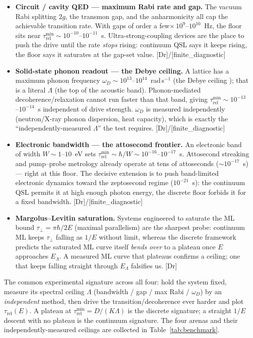 \documentclass[10pt,twocolumn]{article}
\theoremstyle{definition}
\newcommand{\Fin}{\textsf{[finite\_diagnostic]}}
\newcommand{\Dr}{\textsf{[Dr]}}
\begin{document}
\begin{itemize}\itemsep2pt
\item \textbf{Circuit / cavity QED --- maximum Rabi rate and gap.} The vacuum Rabi
  splitting $2g$, the transmon gap, and the anharmonicity all cap the achievable
  transition rate. With gaps of order a few$\times\,10^{9}$--$10^{10}$~Hz, the floor sits
  near $\tau_{\mathrm{rel}}^{\min}\sim 10^{-10}$--$10^{-11}$~s. Ultra-strong-coupling devices are the
  place to push the drive until the rate \emph{stops} rising: continuum QSL says it keeps
  rising, the floor says it saturates at the gap-set value. \Dr{}/\Fin{}
\item \textbf{Solid-state phonon readout --- the Debye ceiling.} A lattice has a maximum
  phonon frequency $\omega_D\sim 10^{13}$--$10^{14}$~rad\,s$^{-1}$ (the Debye ceiling
  \cite{debye1912}); that is a literal
  $\Lambda$ (the top of the acoustic band). Phonon-mediated decoherence/relaxation cannot
  run faster than that band, giving $\tau_{\mathrm{rel}}^{\min}\sim 10^{-13}$--$10^{-14}$~s independent
  of drive strength. $\omega_D$ is measured independently (neutron/X-ray phonon
  dispersion, heat capacity), which is exactly the ``independently-measured $\Lambda$''
  the test requires. \Dr{}/\Fin{}
\item \textbf{Electronic bandwidth --- the attosecond frontier.} An electronic band of
  width $W\sim 1$--$10$~eV sets $\tau_{\mathrm{rel}}^{\min}\sim\hbar/W\sim 10^{-16}$--$10^{-17}$~s.
  Attosecond streaking and pump--probe metrology already operate at tens of attoseconds
  ($\sim 10^{-17}$~s) --- right at this floor. The decisive extension is to push
  band-limited electronic dynamics toward the zeptosecond regime ($10^{-21}$~s): the
  continuum QSL permits it at high enough photon energy, the discrete floor forbids it for
  a fixed bandwidth. \Dr{}/\Fin{}
\item \textbf{Margolus--Levitin saturation.} Systems engineered to saturate the ML bound
  \cite{margolus1998} $\tau_\perp=\pi\hbar/2E$ (maximal parallelism) are the sharpest probe: continuum ML
  keeps $\tau_\perp$ falling as $1/E$ without limit, whereas the discrete framework
  predicts the saturated ML curve itself \emph{bends over} to a plateau once $E$ approaches
  $E_\Lambda$. A measured ML curve that plateaus confirms a ceiling; one that keeps
  falling straight through $E_\Lambda$ falsifies us. \Dr{}
\end{itemize}

The common experimental signature across all four: hold the system fixed, measure its
spectral ceiling $\Lambda$ (bandwidth / gap / max Rabi / $\omega_D$) by an
\emph{independent} method, then drive the transition/decoherence ever harder and plot
$\tau_{\mathrm{rel}}(E)$. A plateau at $\tau_{\mathrm{rel}}^{\min}=D/(K\Lambda)$ is the discrete signature; a
straight $1/E$ descent with no plateau is the continuum signature. The four arenas and
their independently-measured ceilings are collected in Table~\ref{tab:benchmark}.
\end{document}
